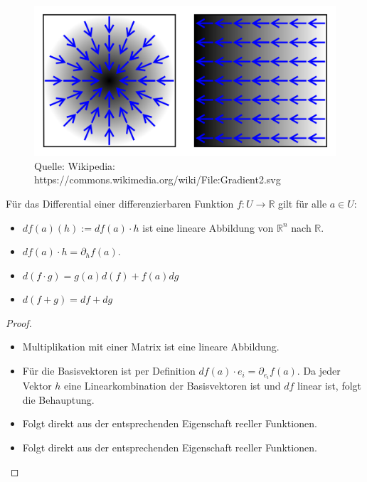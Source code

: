 \begin{figure}[H]
      \centering
    \includegraphics[width=1.0\textwidth]{images/Gradient}
      \caption{Quelle: Wikipedia: https://commons.wikimedia.org/wiki/File:Gradient2.svg}
\end{figure}


\begin{Bemerkung}
\label{partial1}
Für das Differential einer differenzierbaren Funktion  $f: U \to \mathbb{R}$ gilt für alle $a \in U$:
\begin{itemize}
\item  $df(a) (h) :=  df(a) \cdot h$ ist eine lineare Abbildung von $\mathbb{R}^n$ nach $\mathbb{R}$.
\item $df(a)  \cdot h = \partial_h f(a)$. 
\item $d (f \cdot g) = g(a) d(f) + f(a) dg$
\item $d(f + g) = df + dg$
\end{itemize}
\end{Bemerkung}
\begin{proof}
\begin{itemize}
\item  Multiplikation mit einer Matrix ist eine lineare Abbildung.
\item Für die Basisvektoren ist per Definition $df(a)  \cdot e_i = \partial_{e_i} f(a)$. Da jeder Vektor $h$ eine Linearkombination der Basisvektoren ist und $df$ linear ist, folgt die Behauptung.
\item Folgt direkt aus der entsprechenden Eigenschaft reeller Funktionen.
\item Folgt direkt aus der entsprechenden Eigenschaft reeller Funktionen.
\end{itemize}
\end{proof}


